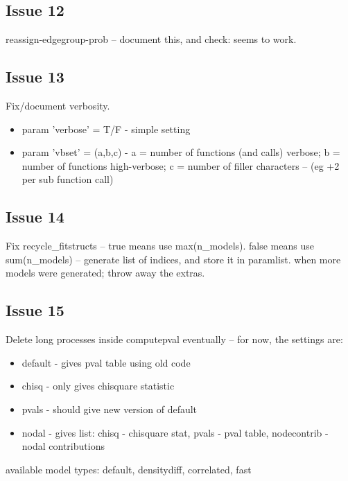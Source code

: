 \documentclass[11pt]{article}
\begin{document}
\subsection*{Issue 12}
reassign-edgegroup-prob -- document this, and check: seems to work. 

\subsection*{Issue 13}
Fix/document verbosity. 
\begin{itemize}
\item param 'verbose' = T/F - simple setting
\item param 'vbset' = (a,b,c) - a = number of functions (and calls) verbose; b = number of functions high-verbose; c = number of filler characters -- (eg +2 per sub function call)
\end{itemize}

\subsection*{Issue 14}
Fix recycle\_fitstructs -- true means use max(n\_models). false means use sum(n\_models) -- generate list of indices, and store it in paramlist. when more models were generated; throw away the extras. 

\subsection*{Issue 15}
Delete long processes inside computepval eventually -- for now, the settings are: 
\begin{itemize}
\item default - gives pval table using old code
\item chisq - only gives chisquare statistic
\item pvals - should give new version of default
\item nodal - gives list: chisq - chisquare stat, pvals - pval table, nodecontrib - nodal contributions
\end{itemize}
available model types: default, densitydiff, correlated, fast

\end{document}
